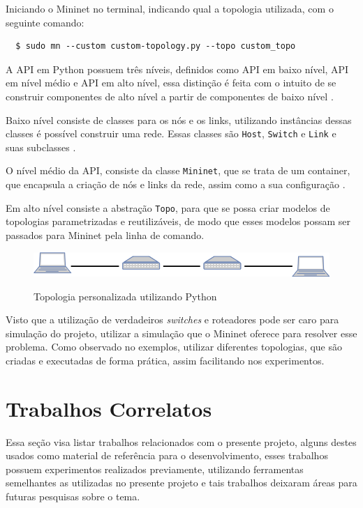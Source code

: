 \documentclass[
    12pt,
    openright, 
    oneside,
    a4paper,
    french,
    english,
    brazil
    ]{facom-ufu-abntex2}
\theoremstyle{definition}
\begin{document}
Iniciando o Mininet no terminal, indicando qual a topologia utilizada, com o seguinte comando:

\begin{verbatim}
  $ sudo mn --custom custom-topology.py --topo custom_topo
\end{verbatim}

A API em Python possuem três níveis, definidos como API em baixo nível, API em nível médio e API
em alto nível, essa distinção é feita com o intuito de se construir componentes de alto nível
a partir de componentes de baixo nível \cite{mininetDocs}.

Baixo nível consiste de classes para os nós e os links, utilizando instâncias dessas 
classes é possível construir uma rede. Essas classes são \texttt{Host}, \texttt{Switch} e
\texttt{Link} e suas subclasses \cite{mininetDocs}.

O nível médio da API, consiste da classe \texttt{Mininet}, que se trata de um container,
que encapsula a criação de nós e links da rede, assim como a sua configuração \cite{mininetDocs}.

Em alto nível consiste a abstração \texttt{Topo}, para que se possa criar modelos de topologias 
parametrizadas e reutilizáveis, de modo que esses modelos possam ser passados para Mininet
pela linha de comando.

\begin{figure}[ht]
    \caption{Topologia personalizada utilizando Python}
    \centering
    \includegraphics[width=\textwidth]{images/2sw-2host.png}
    \label{fig:custom-topology-example}
\end{figure}

Visto que a utilização de verdadeiros \emph{switches} e roteadores pode ser caro para simulação do
projeto, utilizar a simulação que o Mininet oferece para resolver esse problema.
Como observado no exemplos, utilizar diferentes topologias, que são criadas e 
executadas de forma prática, assim facilitando nos experimentos.

\section{Trabalhos Correlatos}
Essa seção visa listar trabalhos relacionados com o presente projeto, alguns destes usados
como material de referência para o desenvolvimento, esses trabalhos possuem experimentos
realizados previamente, utilizando ferramentas semelhantes as utilizadas no presente projeto 
e tais trabalhos deixaram áreas para futuras pesquisas sobre o tema.
\end{document}
